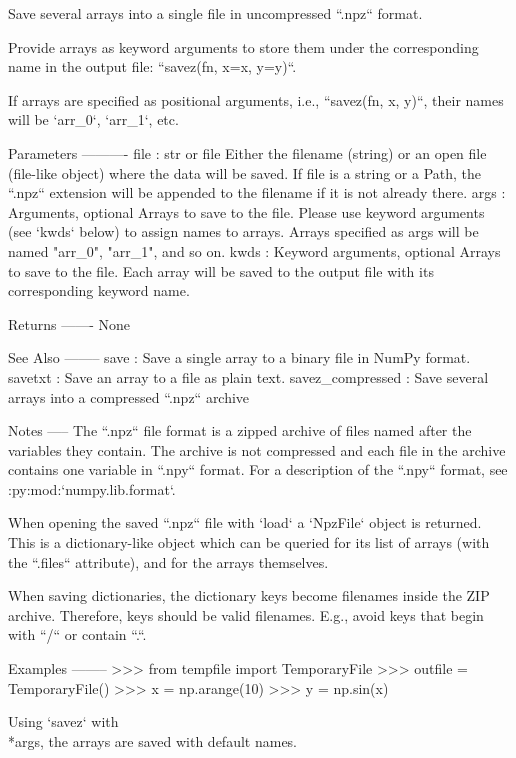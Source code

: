 \begin{DoxyVerb}
\begin{DoxyVerb}Save several arrays into a single file in uncompressed ``.npz`` format.

Provide arrays as keyword arguments to store them under the
corresponding name in the output file: ``savez(fn, x=x, y=y)``.

If arrays are specified as positional arguments, i.e., ``savez(fn,
x, y)``, their names will be `arr_0`, `arr_1`, etc.

Parameters
----------
file : str or file
    Either the filename (string) or an open file (file-like object)
    where the data will be saved. If file is a string or a Path, the
    ``.npz`` extension will be appended to the filename if it is not
    already there.
args : Arguments, optional
    Arrays to save to the file. Please use keyword arguments (see
    `kwds` below) to assign names to arrays.  Arrays specified as
    args will be named "arr_0", "arr_1", and so on.
kwds : Keyword arguments, optional
    Arrays to save to the file. Each array will be saved to the
    output file with its corresponding keyword name.

Returns
-------
None

See Also
--------
save : Save a single array to a binary file in NumPy format.
savetxt : Save an array to a file as plain text.
savez_compressed : Save several arrays into a compressed ``.npz`` archive

Notes
-----
The ``.npz`` file format is a zipped archive of files named after the
variables they contain.  The archive is not compressed and each file
in the archive contains one variable in ``.npy`` format. For a
description of the ``.npy`` format, see :py:mod:`numpy.lib.format`.

When opening the saved ``.npz`` file with `load` a `NpzFile` object is
returned. This is a dictionary-like object which can be queried for
its list of arrays (with the ``.files`` attribute), and for the arrays
themselves.

When saving dictionaries, the dictionary keys become filenames
inside the ZIP archive. Therefore, keys should be valid filenames.
E.g., avoid keys that begin with ``/`` or contain ``.``.

Examples
--------
>>> from tempfile import TemporaryFile
>>> outfile = TemporaryFile()
>>> x = np.arange(10)
>>> y = np.sin(x)

Using `savez` with \\*args, the arrays are saved with default names.


\end{DoxyVerb}
\end{DoxyVerb}
